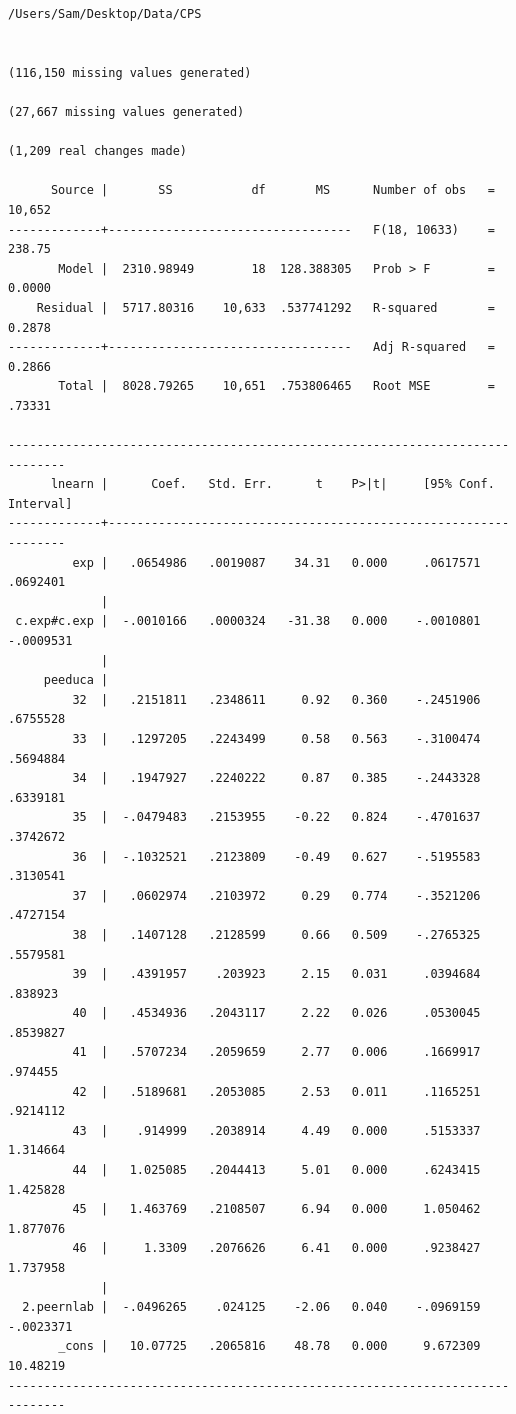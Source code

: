 \documentclass[
]{book}
\begin{document}
\begin{verbatim}
/Users/Sam/Desktop/Data/CPS


(116,150 missing values generated)

(27,667 missing values generated)

(1,209 real changes made)

      Source |       SS           df       MS      Number of obs   =    10,652
-------------+----------------------------------   F(18, 10633)    =    238.75
       Model |  2310.98949        18  128.388305   Prob > F        =    0.0000
    Residual |  5717.80316    10,633  .537741292   R-squared       =    0.2878
-------------+----------------------------------   Adj R-squared   =    0.2866
       Total |  8028.79265    10,651  .753806465   Root MSE        =    .73331

------------------------------------------------------------------------------
      lnearn |      Coef.   Std. Err.      t    P>|t|     [95% Conf. Interval]
-------------+----------------------------------------------------------------
         exp |   .0654986   .0019087    34.31   0.000     .0617571    .0692401
             |
 c.exp#c.exp |  -.0010166   .0000324   -31.38   0.000    -.0010801   -.0009531
             |
     peeduca |
         32  |   .2151811   .2348611     0.92   0.360    -.2451906    .6755528
         33  |   .1297205   .2243499     0.58   0.563    -.3100474    .5694884
         34  |   .1947927   .2240222     0.87   0.385    -.2443328    .6339181
         35  |  -.0479483   .2153955    -0.22   0.824    -.4701637    .3742672
         36  |  -.1032521   .2123809    -0.49   0.627    -.5195583    .3130541
         37  |   .0602974   .2103972     0.29   0.774    -.3521206    .4727154
         38  |   .1407128   .2128599     0.66   0.509    -.2765325    .5579581
         39  |   .4391957    .203923     2.15   0.031     .0394684     .838923
         40  |   .4534936   .2043117     2.22   0.026     .0530045    .8539827
         41  |   .5707234   .2059659     2.77   0.006     .1669917     .974455
         42  |   .5189681   .2053085     2.53   0.011     .1165251    .9214112
         43  |    .914999   .2038914     4.49   0.000     .5153337    1.314664
         44  |   1.025085   .2044413     5.01   0.000     .6243415    1.425828
         45  |   1.463769   .2108507     6.94   0.000     1.050462    1.877076
         46  |     1.3309   .2076626     6.41   0.000     .9238427    1.737958
             |
  2.peernlab |  -.0496265    .024125    -2.06   0.040    -.0969159   -.0023371
       _cons |   10.07725   .2065816    48.78   0.000     9.672309    10.48219
------------------------------------------------------------------------------



\end{verbatim}
\end{document}
